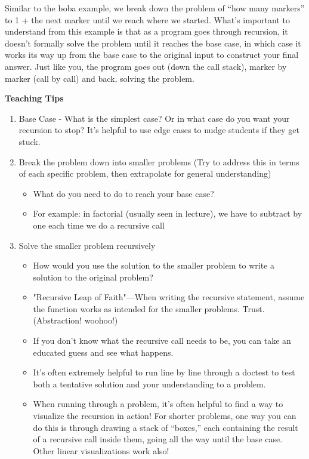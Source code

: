\begin{blocksection}
Similar to the boba example, we break down the problem of ``how many markers'' to 1 + the next marker until we reach where we started. What's important to understand from this example is that as a program goes through recursion, it doesn't formally solve the problem until it reaches the base case, in which case it works its way up from the base case to the original input to construct your final answer. Just like you, the program goes out (down the call stack), marker by marker (call by call) and back, solving the problem.
\end{blocksection}

\begin{meta}
\textbf{Teaching Tips}
\begin{enumerate}
	    \item Base Case - What is the simplest case? Or in what case do you want your recursion to stop? It's helpful to use edge cases to nudge students if they get stuck.
	    \item Break the problem down into smaller problems (Try to address this in terms of each specific problem, then extrapolate for general understanding)
	    \begin{itemize}
			\item What do you need to do to reach your base case?
			\item For example: in factorial (usually seen in lecture), we have to subtract by one each time we do a recursive call
		\end{itemize}
		\item Solve the smaller problem recursively
		\begin{itemize}
			\item How would you use the solution to the smaller problem to write a solution to the original problem?
			\item "Recursive Leap of Faith"---When writing the recursive statement, assume the function works as intended for the smaller problems. Trust. (Abstraction! woohoo!)
			\item If you don't know what the recursive call needs to be, you can take an educated guess and see what happens. 
			\item It's often extremely helpful to run line by line through a doctest to test both a tentative solution and your understanding to a problem.
			\item When running through a problem, it's often helpful to find a way to visualize the recursion in action! For shorter problems, one way you can do this is through drawing a stack of ``boxes,'' each containing the result of a recursive call inside them, going all the way until the base case. Other linear visualizations work also!

\end{itemize}
\end{enumerate}
\end{meta}
